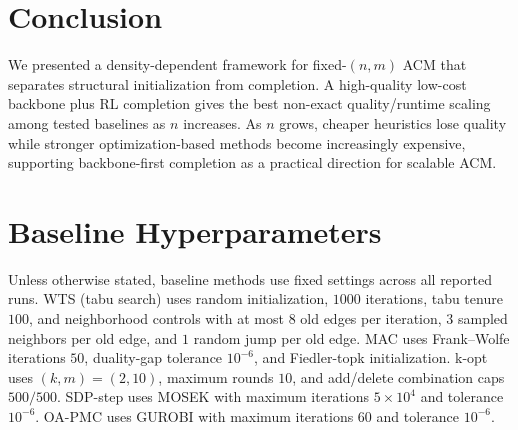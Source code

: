 \documentclass[letterpaper, 10 pt, conference]{ieeeconf}  %
\newcommand{\1}{\mathbf{1}}
\newcommand{\0}{\mathbf{0}}
\begin{document}
\section{Conclusion}
We presented a density-dependent framework for fixed-\((n,m)\) ACM that separates structural initialization from completion.
A high-quality low-cost backbone plus RL completion gives the best non-exact quality/runtime scaling among tested baselines as \(n\) increases.
As \(n\) grows, cheaper heuristics lose quality while stronger optimization-based methods become increasingly expensive, supporting backbone-first completion as a practical direction for scalable ACM.

\appendix
\section{Baseline Hyperparameters}
\label{app:baseline_hparams}
Unless otherwise stated, baseline methods use fixed settings across all reported runs. WTS (tabu search) uses random initialization, \(1000\) iterations, tabu tenure \(100\), and neighborhood controls with at most \(8\) old edges per iteration, \(3\) sampled neighbors per old edge, and \(1\) random jump per old edge. MAC uses Frank--Wolfe iterations \(50\), duality-gap tolerance \(10^{-6}\), and Fiedler-topk initialization. k-opt uses \((k,m)=(2,10)\), maximum rounds \(10\), and add/delete combination caps \(500/500\). SDP-step uses MOSEK with maximum iterations \(5\times 10^4\) and tolerance \(10^{-6}\). OA-PMC uses GUROBI with maximum iterations \(60\) and tolerance \(10^{-6}\).



\end{document}
